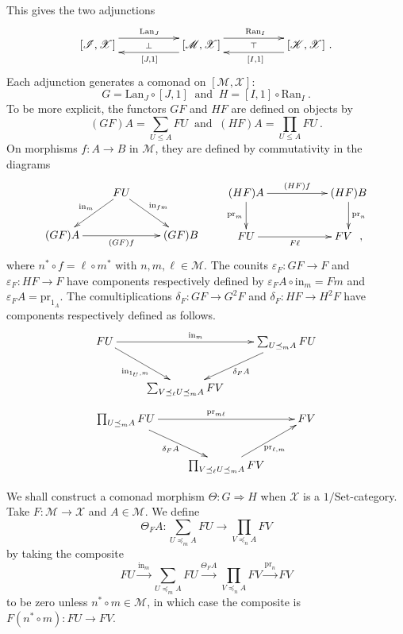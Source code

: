 \documentclass[a4paper,12pt,reqno]{amsart}
\theoremstyle{definition}
\theoremstyle{fact}
\theoremstyle{genquest}
\theoremstyle{step}
\newcommand{\dd}{\colon}
\newcommand{\lra}{\longrightarrow}
\newcommand{\ra}{\rightarrow}
\def\CI{{\mathscr I}}
\def\CK{{\mathscr K}}
\def\CM{{\mathscr M}}
\def\CX{{\mathscr X}}
\begin{document}
This gives the two adjunctions
\begin{equation}\label{twoadj} 
\xymatrix @R-3mm {
[\CI,\CX] \ar@<1.5ex>[rr]^{\mathrm{Lan}_J} \ar@{}[rr]|-{\bot} && [\CM,\CX]
\ar@<1.5ex>[rr]^{\mathrm{Ran}_I}  \ar@{}[rr]|-{\top} \ar@<1.5ex>[ll]^{[J,1]} && [\CK,\CX]
\ar@<1.5ex>[ll]^{[I,1]}  \ .
}
\end{equation}
Each adjunction generates a comonad on $[\CM,\CX]$:
\begin{equation}\label{twocmnd}
G = \mathrm{Lan}_J \circ [J,1] \ \text{ and } \  H = [I,1] \circ \mathrm{Ran}_I \ .
\end{equation}
To be more explicit, the functors $GF$ and $HF$ are defined on objects by 
$$(GF)A=\sum_{U\le A}{FU} \ \text{ and } \ (HF)A=\prod_{U\le A}{FU} \ .$$ 
On morphisms $f\dd A\ra B$ in $\CM$, they are defined by commutativity in the diagrams
\begin{equation}
\begin{aligned}
\xymatrix{
 & FU \ar[ld]_-{\mathrm{in}_m} \ar[rd]^-{\mathrm{in}_{fm}}&  \\
(GF)A \ar[rr]_-{(GF)f} && (GF)B}
\qquad
\xymatrix{
(HF)A \ar[rr]^-{(HF)f} \ar[d]_-{\mathrm{pr}_{m}} && (HF)B \ar[d]^-{\mathrm{pr}_n} \\
FU \ar[rr]_-{F\ell} && FV \ \ ,}
\end{aligned}
\end{equation}
where $n^*\circ f = \ell \circ m^*$ with $n, m, \ell \in \CM$.
The counits $\varepsilon_F \dd GF \ra F$ and $\varepsilon_F \dd HF \ra F$ have
components respectively defined by $\varepsilon_FA \circ \mathrm{in}_m = Fm$
and $\varepsilon_FA = \mathrm{pr}_{1_A}$. 
The comultiplications $\delta_F \dd GF\ra G^2F$ and $\delta_F \dd HF\ra H^2F$ 
have components respectively defined as follows.
\begin{equation*}
\xymatrix{
FU \ar[rd]_{\mathrm{in}_{1_U, m}}\ar[rr]^{\mathrm{in}_m}   && \sum_{U\preceq_m A}{FU} \ar[ld]^{\delta_FA} \\
& \sum_{V\preceq_{\ell} U\preceq_m A}{FV}  &
}
\end{equation*}
\begin{equation*}
\xymatrix{
\prod_{U\preceq_m A}{FU} \ar[rd]_{\delta_FA}\ar[rr]^{\mathrm{pr}_{m\ell}}   && FV  \\
& \prod_{V\preceq_{\ell} U\preceq_m A}{FV}\ar[ru]_{\mathrm{pr}_{\ell, m}}  &
}
\end{equation*}
\bigskip

We shall construct a comonad morphism $\Theta \dd G \Rightarrow H$ when $\CX$ is a $1/\mathrm{Set}$-category.
Take $F : \CM \ra \CX$ and $A\in \CM$. We define 
\begin{equation}\label{Thetacmpnt}
\Theta_FA : \sum_{U\preceq_m A}FU \lra \prod_{V\preceq_n A}FV
\end{equation}
by taking the composite
$$ FU\stackrel{\mathrm{in}_m}\lra \sum_{U\preceq_m A}{FU} \stackrel{\Theta_FA}\lra \prod_{V\preceq_n A}{FV} \stackrel{\mathrm{pr}_n}\lra FV$$
to be zero unless $n^*\circ m\in \CM$, in which case the composite is $F(n^*\circ m) \dd FU \ra FV$.
\end{document}
